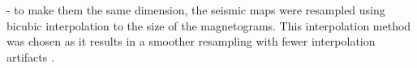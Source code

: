 \documentclass[a4paper,10pt]{report}
\begin{document}


- to make them the same dimension, the seismic maps were resampled using bicubic
interpolation to the size of the magnetograms. This interpolation method was
chosen as it results in a smoother resampling with fewer interpolation artifacts
\citep{keys_cubic_1981}.





 
\end{document}

